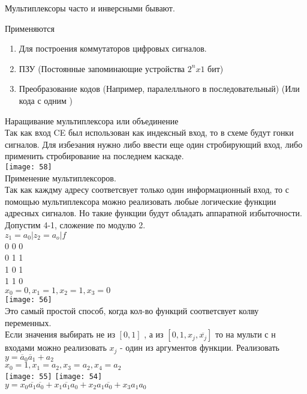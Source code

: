 Мультиплексоры часто и инверсными бывают.

Применяются\\
\begin{enumerate}
  \item Для построения коммутаторов цифровых сигналов.
  \item ПЗУ (Постоянные запоминающие устройства $ 2^n x 1 $ бит)
  \item Преобразование кодов (Например, паралелльного в последовательный) (Или кода с одним )
\end{enumerate}


Наращивание  мультиплексора или объединение\\
Так как вход CE был использован как индексный вход, то в схеме будут гонки сигналов.
Для избеэания нужно либо ввести еще один стробирующий вход, либо применить стробирование на последнем каскаде.\\
\texttt{[image: 58]}\\

Применение мультиплексоров.\\
Так как каждму адресу соответсвует только один информационный вход,
то с помощью мультиплексора можно реализовать любые логические функции адресных сигналов.
Но такие функции будут обладать аппаратной избыточности.
Допустим 4-1, сложение по модулю 2.\\
$z_1=a_0 |z_2 =a_o | f$\\
0 0 0\\
0 1 1\\
1 0 1\\
1 1 0\\
$x_0 = 0 , x_1 = 1, x_2 = 1, x_3 = 0$\\
\texttt{[image: 56]}\\
Это самый простой способ, когда кол-во функций соответсвует колву переменных.\\
Если значения выбирать не из $[0,1]$ , а из $[0,1,x_j,  \overline{x_j}]$ то на мульти с н входами можно реализовать
$x_j$ - один из аргументов функции.
Реализовать\\
$y = \overline{a}_0 \overline{a}_1 + a_2$\\
$x_0 = 1, x_1 = a_2, x_3= a_2,x_4= a_2$\\
\texttt{[image: 55]}
\texttt{[image: 54]}\\

$y = x_0 \overline{a_1}\overline{a_0} + x_1 \overline{a_1} a_0 + x_2 a_1 \overline{a_0} + x_3 a_1 a_0$\\

